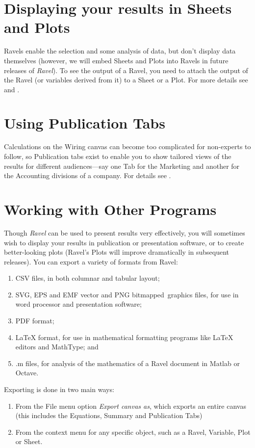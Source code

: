 \section{Displaying your results in Sheets and Plots}

Ravels enable the selection and some analysis of data, but don't display
data themselves (however, we will embed Sheets and Plots into Ravels
in future releases of \emph{Ravel}). To see the output of a Ravel,
you need to attach the output of the Ravel (or variables derived from
it) to a Sheet or a Plot. For more details see
 and .

\section{Using Publication Tabs}

Calculations on the Wiring canvas can become too complicated for non-experts
to follow, so Publication tabs exist to enable you to show tailored
views of the results for different audiences---say one Tab for the
Marketing and another for the Accounting divisions of a company. For
details see .

\section{Working with Other Programs \label{Export}}

Though \emph{Ravel} can be used to present results very effectively,
you will sometimes wish to display your results in publication or
presentation software, or to create better-looking plots (Ravel's
Plots will improve dramatically in subsequent releases). You can export
a variety of formats from Ravel:
\begin{enumerate}
\item CSV files, in both columnar and tabular layout;
\item SVG, EPS and EMF vector and PNG bitmapped~graphics files, for use in word
processor and presentation software;
\item PDF format;
\item LaTeX format, for use in mathematical formatting programs like \LaTeX{}
editors and MathType; and
\item .m files, for analysis of the mathematics of a Ravel document in
  Matlab or Octave.
\end{enumerate}
Exporting is done in two main ways:
\begin{enumerate}
\item From the File menu option \emph{Export canvas as}, which exports an
entire canvas (this includes the Equations, Summary and Publication
Tabs)
\item From the context menu for any specific object, such as a Ravel, Variable,
Plot or Sheet.
\end{enumerate}

